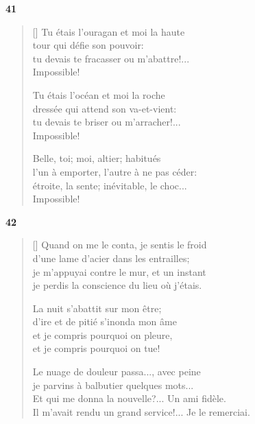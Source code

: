 \documentclass[a4paper,12pt]{book}
\begin{document}
\bigskip

\begin{center}
  \textbf{41}
\end{center}

\settowidth{\versewidth}{l'un à emporter, l'autre à ne pas céder;}

\begin{verse}[\versewidth]
  Tu étais l'ouragan et moi la haute \\
  tour qui défie son pouvoir: \\
  tu devais te fracasser ou m'abattre!... \\
  Impossible!

  Tu étais l'océan et moi la roche \\
  dressée qui attend son va-et-vient: \\
  tu devais te briser ou m'arracher!... \\
  Impossible!

  Belle, toi; moi, altier; habitués \\
  l'un à emporter, l'autre à ne pas céder: \\
  étroite, la sente; inévitable, le choc... \\
  Impossible!
\end{verse}

\bigskip

\begin{center}
  \textbf{42}
\end{center}

\settowidth{\versewidth}{Il m'avait rendu service!... Je le remerciai.}

\begin{verse}[\versewidth]
  Quand on me le conta, je sentis le froid \\
  d'une lame d'acier dans les entrailles; \\
  je m'appuyai contre le mur, et un instant \\
  je perdis la conscience du lieu où j'étais.

  La nuit s'abattit sur mon être; \\
  d'ire et de pitié s'inonda mon âme \\
  et je compris pourquoi on pleure, \\
  et je compris pourquoi on tue!

  Le nuage de douleur passa..., avec peine \\
  je parvins à balbutier quelques mots... \\
  Et qui me donna la nouvelle?... Un ami fidèle. \\
  Il m'avait rendu un grand service!... Je le remerciai.
\end{verse}
\end{document}
